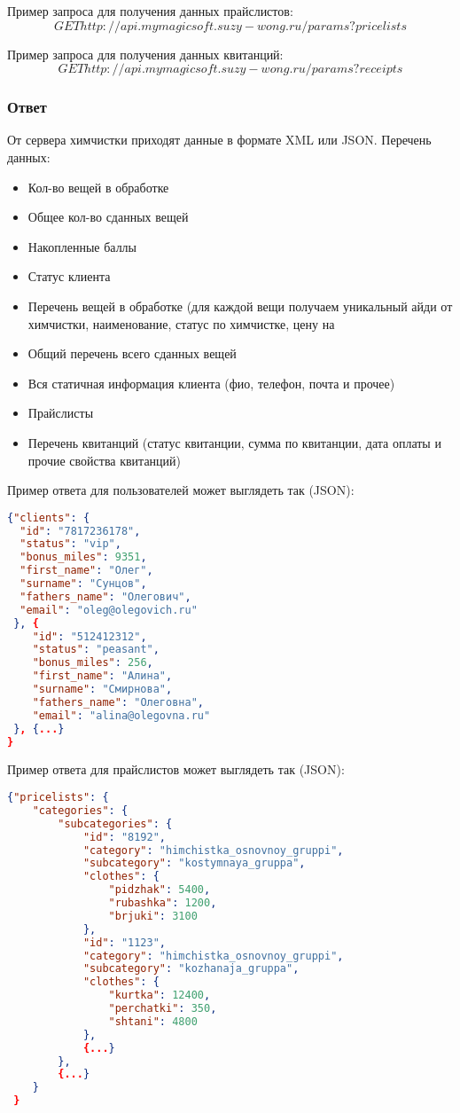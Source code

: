\documentclass[DIV=calc, paper=a4, fontsize=11pt]{scrartcl} %
\begin{document}
Пример запроса для получения данных прайслистов:
\begin{displaymath}
	GET http://api.mymagicsoft.suzy-wong.ru/params?pricelists
\end{displaymath}	

Пример запроса для получения данных квитанций:
\begin{displaymath}
	GET http://api.mymagicsoft.suzy-wong.ru/params?receipts
\end{displaymath}	

\subsubsection{Ответ}\label{subsubsec:response_lk}
От сервера химчистки приходят данные в формате XML или JSON. Перечень данных:
\begin{itemize}
	\item Кол-во вещей в обработке
	\item Общее кол-во сданных вещей
	\item Накопленные баллы
	\item Статус клиента
	\item Перечень вещей в обработке (для каждой вещи получаем уникальный айди от химчистки, наименование, статус по химчистке, цену на 
	\item Общий перечень всего сданных вещей
	\item Вся статичная информация клиента (фио, телефон, почта и прочее)
	\item Прайслисты
	\item Перечень квитанций (статус квитанции, сумма по квитанции, дата оплаты и прочие свойства квитанций)
\end{itemize}

Пример ответа для пользователей может выглядеть так (JSON):
\begin{lstlisting}[language=json,firstnumber=1]
{"clients": {
  "id": "7817236178",
  "status": "vip",
  "bonus_miles": 9351,
  "first_name": "Олег",
  "surname": "Сунцов",
  "fathers_name": "Олегович",
  "email": "oleg@olegovich.ru"
 }, {
 	"id": "512412312",
 	"status": "peasant",
 	"bonus_miles": 256,
	"first_name": "Алина",
  	"surname": "Смирнова",
  	"fathers_name": "Олеговна",
  	"email": "alina@olegovna.ru"
 }, {...}
}
\end{lstlisting}

Пример ответа для прайслистов может выглядеть так (JSON):
\begin{lstlisting}[language=json,firstnumber=1]
{"pricelists": {
	"categories": {
		"subcategories": {
			"id": "8192",
			"category": "himchistka_osnovnoy_gruppi",
			"subcategory": "kostymnaya_gruppa",	
			"clothes": {
				"pidzhak": 5400,
				"rubashka": 1200,
				"brjuki": 3100
			},
			"id": "1123",
			"category": "himchistka_osnovnoy_gruppi",
			"subcategory": "kozhanaja_gruppa",	
			"clothes": {
				"kurtka": 12400,
				"perchatki": 350,
				"shtani": 4800
			},
			{...}
		},
		{...}
	}
 }
\end{lstlisting}
\end{document}
